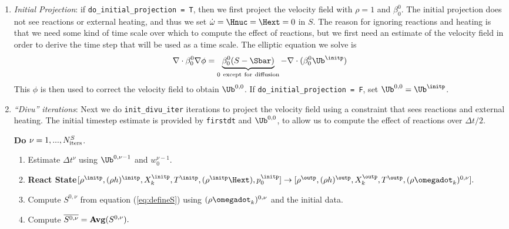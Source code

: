 \begin{enumerate}
\renewcommand{\theenumi}{{\bf \alph{enumi}}}
\renewcommand{\labelenumii}{\roman{enumii}.}

\item {\em Initial Projection}: if {\tt do\_initial\_projection = T}, then we 
   first project the velocity field with $\rho = 1$ and $\beta_0^0$.
   The initial projection does not see reactions
   or external heating, and thus we set $\dot\omega = \Hnuc = \Hext = 0$ in $S$.
   The reason for ignoring reactions and heating is that we need some kind of 
   time scale over which to compute the effect of reactions, but we first 
   need an estimate of the velocity
   field in order to derive the time step that will be used as a time scale.
   The elliptic equation we solve is 
   \begin{equation}
   \nabla \cdot \beta_0^0 \nabla \phi = \underbrace{\beta_0^0(S - \Sbar)}_\mathrm{0~ except~ for~ diffusion} - \nabla \cdot (\beta_0^0 \Ub^{\initp})
   \end{equation}
   This $\phi$ is then used to correct the velocity field to obtain $\Ub^{0,0}$.
   If {\tt do\_initial\_projection = F}, set $\Ub^{0,0} = \Ub^{\initp}$.

\item {\em ``Divu'' iterations}: Next we do {\tt init\_divu\_iter} iterations 
  to project the velocity field using a constraint that sees reactions
  and external heating. 
  The initial timestep estimate is provided by {\tt firstdt} and
  $\Ub^{0,0}$, to allow us to compute the effect of reactions over $\Delta t/2$.

  {\bf Do} {$\nu = 1,...,N_{\rm iters}^{S}$.}
  \begin{enumerate}

  \item Estimate $\Delta t^\nu$ using $\Ub^{0,\nu-1}$ and $w_0^{\nu-1}.$

  \item {\bf React State}$[ \rho^{\initp},(\rho h)^{\initp}, X_k^{\initp}, T^{\initp}, 
(\rho^{\initp} \Hext), p_0^{\initp}] \rightarrow [\rho^{\outp}, (\rho h)^{\outp}, 
X_k^{\outp}, T^{\outp}, (\rho \omegadot_k)^{0,\nu} ].$

  \item Compute $S^{0,\nu}$ from equation (\ref{eq:defineS}) 
        using $(\rho \omegadot_k)^{0,\nu}$ and the initial data.

  \item Compute $\overline{S^{0,\nu}} = {\mathrm{\bf Avg}} (S^{0,\nu}).$


\end{enumerate}
\end{enumerate}
